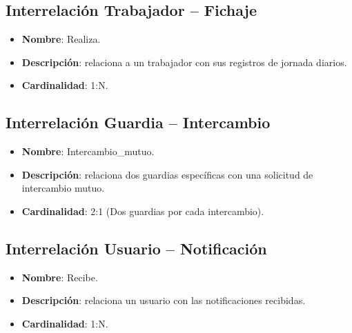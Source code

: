 \subsection{Interrelación Trabajador -- Fichaje}
\begin{itemize}
    \item \textbf{Nombre}: Realiza.
    \item \textbf{Descripción}: relaciona a un trabajador con sus registros de jornada diarios.
    \item \textbf{Cardinalidad}: 1:N.
\end{itemize}

\subsection{Interrelación Guardia -- Intercambio}
\begin{itemize}
    \item \textbf{Nombre}: Intercambio\_mutuo.
    \item \textbf{Descripción}: relaciona dos guardias específicas con una solicitud de intercambio mutuo.
    \item \textbf{Cardinalidad}: 2:1 (Dos guardias por cada intercambio).
\end{itemize}

\subsection{Interrelación Usuario -- Notificación}
\begin{itemize}
    \item \textbf{Nombre}: Recibe.
    \item \textbf{Descripción}: relaciona un usuario con las notificaciones recibidas.
    \item \textbf{Cardinalidad}: 1:N.
\end{itemize}

